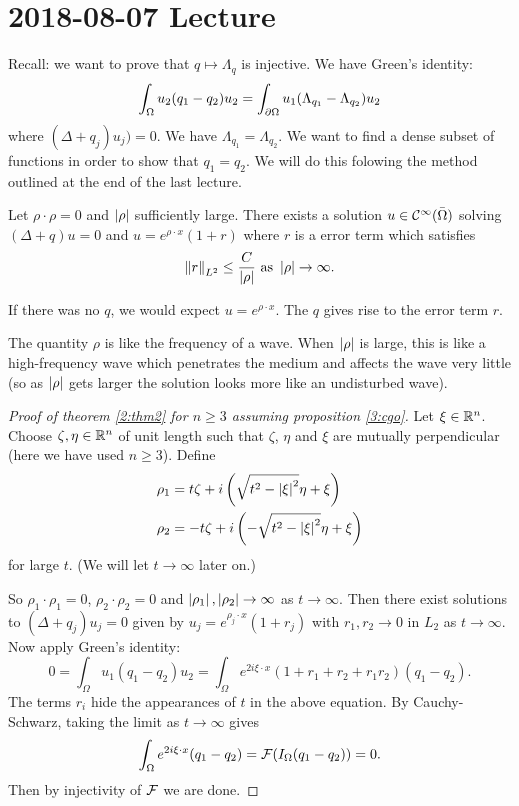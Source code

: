 \section{2018-08-07 Lecture}

Recall: we want to prove that $q \mapsto \Lambda_q$ is injective.
We have Green's identity:
\[ \int_\Omega u_2(q_1-q_2)u_2 = \int_{\partial\Omega} u_1(\Lambda_{q_1}-\Lambda_{q_2})u_2 \]
where $(\Delta+q_j)u_j)=0$.
We have $\Lambda_{q_1}=\Lambda_{q_2}$.
We want to find a dense subset of functions in order to show that $q_1=q_2$.
We will do this folowing the method outlined at the end of the last lecture.

\begin{prop}\label{3:cgo}
  Let $\rho\cdot\rho=0$ and $\left\lvert \rho \right\rvert$ sufficiently large.  
  There exists a solution $u \in \mathcal{C}^\infty(\bar\Omega)$ solving $(\Delta+q)u=0$ and $u=e^{\rho\cdot x}(1+r)$ where $r$ is a error term which satisfies
  \[ \left\lVert r \right\rVert_{L^2} \leq \frac{C}{\left\lvert \rho \right\rvert} \text{ as } \left\lvert \rho \right\rvert \to \infty. \]
\end{prop}

\begin{rmk}
  If there was no $q$, we would expect $u=e^{\rho\cdot x}$.
  The $q$ gives rise to the error term $r$.
\end{rmk}

\begin{rmk}
  The quantity $\rho$ is like the frequency of a wave.
  When $\left\lvert \rho \right\rvert$ is large, this is like a high-frequency wave which penetrates the medium and affects the wave very little (so as $\left\lvert \rho \right\rvert$ gets larger the solution looks more like an undisturbed wave).
\end{rmk}

\begin{proof}[Proof of theorem \ref{2:thm2} for $n \geq 3$ assuming proposition \ref{3:cgo}]
  Let $\xi \in \mathbb{R}^n$.
  Choose $\zeta, \eta \in \mathbb{R}^n$ of unit length such that $\zeta$, $\eta$ and $\xi$ are mutually perpendicular (here we have used $n \geq 3$).
  Define
  \begin{align*}
    \rho_1 &= t\zeta + i\left( \sqrt{t^2-\left\lvert \xi \right\rvert^2} \eta + \xi \right) \\
    \rho_2 &= -t\zeta + i\left( -\sqrt{t^2-\left\lvert \xi \right\rvert^2} \eta + \xi \right)
  \end{align*}
  for large $t$.
  (We will let $t \to \infty$ later on.)

  So $\rho_1 \cdot \rho_1 = 0$, $\rho_2 \cdot \rho_2 = 0$ and $\left\lvert \rho_1 \right\rvert, \left\lvert \rho_2 \right\rvert \to \infty$ as $t \to \infty$.
Then there exist solutions to $(\Delta+q_j)u_j=0$ given by $u_j=e^{\rho_j\cdot x}(1+r_j)$ with $r_1,r_2 \to 0$ in $L_2$ as $t \to \infty$.
  Now apply Green's identity:
  \[ 0 = \int_\Omega u_1(q_1-q_2)u_2 = \int_\Omega e^{2i\xi\cdot x}(1+r_1+r_2+r_1r_2)(q_1-q_2). \]
  The terms $r_i$ hide the appearances of $t$ in the above equation.
  By Cauchy-Schwarz, taking the limit as $t \to \infty$ gives
  \[ \int_\Omega e^{2i\xi\cdot x}(q_1-q_2) = \mathcal{F}(I_\Omega(q_1-q_2)) = 0. \]
  Then by injectivity of $\mathcal{F}$ we are done.
\end{proof}

